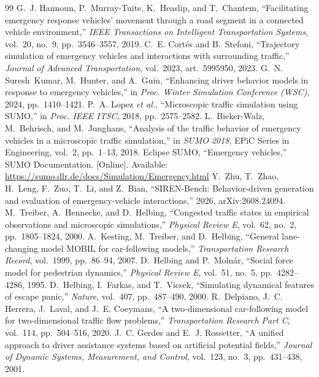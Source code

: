 \documentclass[conference,a4paper]{IEEEtran}
\begin{document}
\begin{thebibliography}{99}
 G.~J. Hannoun, P.~Murray-Tuite, K.~Heaslip, and T.~Chantem, ``Facilitating emergency response vehicles' movement through a road segment in a connected vehicle environment,'' \emph{IEEE Transactions on Intelligent Transportation Systems}, vol.~20, no.~9, pp.~3546--3557, 2019.
 C.~E. Cort\'es and B.~Stefoni, ``Trajectory simulation of emergency vehicles and interactions with surrounding traffic,'' \emph{Journal of Advanced Transportation}, vol.~2023, art.~5995950, 2023.
 G.~N. Suresh~Kumar, M.~Hunter, and A.~Guin, ``Enhancing driver behavior models in response to emergency vehicles,'' in \emph{Proc. Winter Simulation Conference (WSC)}, 2024, pp.~1410--1421.
 P.~A. Lopez \emph{et al.}, ``Microscopic traffic simulation using SUMO,'' in \emph{Proc. IEEE ITSC}, 2018, pp.~2575--2582.
 L.~Bieker-Walz, M.~Behrisch, and M.~Junghans, ``Analysis of the traffic behavior of emergency vehicles in a microscopic traffic simulation,'' in \emph{SUMO 2018}, EPiC Series in Engineering, vol.~2, pp.~1--13, 2018.
 Eclipse SUMO, ``Emergency vehicles,'' SUMO Documentation. [Online]. Available: \url{https://sumo.dlr.de/docs/Simulation/Emergency.html}
 Y.~Zhu, T.~Zhao, H.~Leng, F.~Zuo, T.~Li, and Z.~Bian, ``SIREN-Bench: Behavior-driven generation and evaluation of emergency-vehicle interactions,'' 2026, arXiv:2608.24094.
 M.~Treiber, A.~Hennecke, and D.~Helbing, ``Congested traffic states in empirical observations and microscopic simulations,'' \emph{Physical Review E}, vol.~62, no.~2, pp.~1805--1824, 2000.
 A.~Kesting, M.~Treiber, and D.~Helbing, ``General lane-changing model MOBIL for car-following models,'' \emph{Transportation Research Record}, vol.~1999, pp.~86--94, 2007.
 D.~Helbing and P.~Moln\'ar, ``Social force model for pedestrian dynamics,'' \emph{Physical Review E}, vol.~51, no.~5, pp.~4282--4286, 1995.
 D.~Helbing, I.~Farkas, and T.~Vicsek, ``Simulating dynamical features of escape panic,'' \emph{Nature}, vol.~407, pp.~487--490, 2000.
 R.~Delpiano, J.~C. Herrera, J.~Laval, and J.~E. Coeymans, ``A two-dimensional car-following model for two-dimensional traffic flow problems,'' \emph{Transportation Research Part C}, vol.~114, pp.~504--516, 2020.
 J.~C. Gerdes and E.~J. Rossetter, ``A unified approach to driver assistance systems based on artificial potential fields,'' \emph{Journal of Dynamic Systems, Measurement, and Control}, vol.~123, no.~3, pp.~431--438, 2001.

\end{thebibliography}
\end{document}

